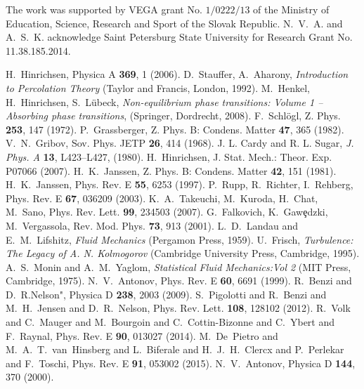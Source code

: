 \documentclass[12pt]{article}
\begin{document}
The work was supported by VEGA grant No. $1/0222/13$ 
 of the Ministry of Education, Science, Research and Sport of the Slovak Republic. N.~V.~A. and
  A.~S.~K. acknowledge Saint Petersburg State University for Research Grant No. 11.38.185.2014.
\begin{thebibliography}{99}
  H.~Hinrichsen, Physica A {\bf 369}, 1 (2006).
  D.~Stauffer, A.~Aharony, {\it Introduction to Percolation Theory}
     (Taylor and Francis, London, 1992).
  M.~Henkel, H.~Hinrichsen, S.~L{\"u}beck, 
     {\it Non-equilibrium phase transitions: Volume 1 – Absorbing phase transitions}, 
     (Springer, Dordrecht, 2008).
  F.~Schl\"ogl, Z. Phys. {\bf 253}, 147 (1972).
  P.~Grassberger, Z. Phys. B: Condens. Matter {\bf 47}, 365 (1982).
  V.~N.~Gribov, Sov. Phys. JETP {\bf 26}, 414 (1968).    
  J. L. Cardy and R. L. Sugar, \emph{ J. Phys. A} {\bf 13}, L423–L427, (1980).
  H.~Hinrichsen, J. Stat. Mech.: Theor. Exp. P07066 (2007).
  H.~K.~Janssen, Z. Phys. B: Condens. Matter {\bf 42}, 151 (1981).
  H.~K.~Janssen, Phys. Rev. E {\bf 55}, 6253 (1997).
  P.~Rupp, R.~Richter, I.~Rehberg, Phys. Rev. E {\bf 67}, 036209 (2003).
  K.~A.~Takeuchi, M.~Kuroda, H.~Chat, M.~Sano, Phys. Rev. Lett. {\bf 99}, 234503 (2007).
  G.~Falkovich, K.~Gaw\c{e}dzki, M.~Vergassola, Rev. Mod. Phys. {\bf 73}, 913 (2001). 
  L.~D.~Landau and E.~M.~Lifshitz, {\it Fluid Mechanics} (Pergamon Press, 1959).
  U.~Frisch, {\it Turbulence: The Legacy of A. N. Kolmogorov} (Cambridge University Press, Cambridge, 1995). 
  A.~S.~Monin and A.~M.~Yaglom, {\it Statistical Fluid Mechanics:Vol 2}
    (MIT Press, Cambridge, 1975). 
  N.~V.~Antonov, Phys. Rev. E {\bf 60}, 6691 (1999).
  R.~Benzi and D.~R.Nelson", Physica D {\bf 238}, 2003 (2009).
  S.~Pigolotti and R.~Benzi and M.~H.~Jensen and D.~R.~Nelson, 
    Phys. Rev. Lett. {\bf 108}, 128102 (2012).
  R.~Volk and C.~Mauger and M.~Bourgoin and C.~Cottin-Bizonne
	      and C.~Ybert and F.~Raynal, Phys. Rev. E {\bf 90}, 013027 (2014).
  M.~De~Pietro and M.~A.~T.~van~Hinsberg and L.~Biferale and
	      H.~J.~H.~Clercx and P.~Perlekar and F.~Toschi, Phys. Rev. E {\bf 91}, 053002 (2015).
  N.~V.~Antonov, Physica D {\bf 144}, 370 (2000).

\end{thebibliography}
\end{document}
